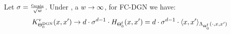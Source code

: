 \begin{theorem}\label{th:main} Let $\sigma=\frac{c_{\text{scale}}}{\sqrt{w}}$. Under , a $w\rightarrow\infty$, for FC-DGN we have: 
\begin{align*}
K^{\text{v}}_{\Theta^{\text{DGN}}_0}(x,x') &\rightarrow d\cdot \sigma^{d-1}\cdot H_{\Theta^{\textrm{f}}_0}(x,x')= d\cdot \sigma^{d-1}\cdot \langle x,x'\rangle_{\Lambda_{\Theta^{\textrm{f}}_0}(\cdot,x,x')}  \\
\end{align*}
\end{theorem}

